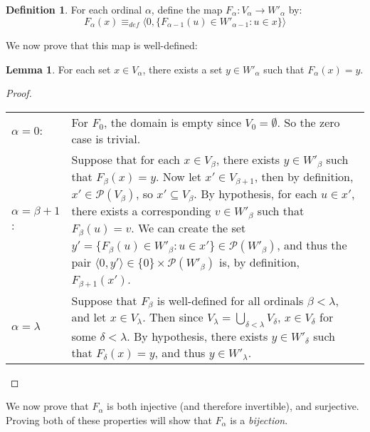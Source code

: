 \documentclass[11pt]{report}
\newcommand{\eqdef}{\equiv_\mathit{def}}
\newcommand{\pair}[2]{\langle #1,#2 \rangle}
\theoremstyle{definition}
\theoremstyle{theorem}
\theoremstyle{lemma}
\newtheorem{definition}{Definition}[section]
\newtheorem{lemma}[theorem]{Lemma}
\begin{document}
\begin{definition}
For each ordinal $\alpha$, define the map $F_\alpha:V_\alpha \to W'_\alpha$ by:
$$F_\alpha(x) \eqdef \pair{0}{\{F_{\alpha-1}(u)\in W'_{\alpha-1}: u\in x\}}$$
\end{definition}
\noindent
We now prove that this map is well-defined:
\begin{lemma}
For each set $x\in V_\alpha$, there exists a set $y\in W'_\alpha$ such that $F_\alpha(x)=y$.
\begin{proof} \hspace{1mm}\\
  \begin{tabular}{p{20mm} p{137mm}}
    $\alpha = 0$: \rule{0pt}{4ex} &
    For $F_0$, the domain is empty since $V_0 = \emptyset$. So the zero case is trivial.
    \\
    $\alpha = \beta+1$: \rule{0pt}{4ex} &
    Suppose that for each $x\in V_\beta$, there exists $y\in W'_\beta$ such that $F_\beta(x) = y$. Now let $x'\in V_{\beta+1}$, then by definition, $x'\in\mathcal{P}(V_\beta)$, so $x'\subseteq V_\beta$. By hypothesis, for each $u\in x'$, there exists a corresponding $v\in W'_\beta$ such that $F_\beta(u) = v$. We can create the set $y'= \{F_\beta(u)\in W'_\beta : u\in x'\}\in \mathcal{P}(W'_\beta)$,
    and thus the pair $\pair{0}{y'} \in \{0\}\times \mathcal{P}(W'_\beta)$ is, by definition, $F_{\beta+1}(x')$.
    \\
    $\alpha = \lambda$ \rule{0pt}{4ex} &
    Suppose that $F_\beta$ is well-defined for all ordinals $\beta<\lambda$, and let $x\in V_\lambda$. Then since $V_\lambda = \bigcup_{\delta<\lambda}V_\delta$, $x\in V_\delta$ for some $\delta<\lambda$. By hypothesis, there exists $y\in W'_\delta$ such that $F_\delta(x)=y$, and thus $y\in W'_\lambda$.
  \end{tabular}
\end{proof}
\end{lemma}
\noindent
We now prove that $F_\alpha$ is both injective (and therefore invertible), and surjective. Proving both of these properties will show that $F_\alpha$ is a \emph{bijection}.
\end{document}
